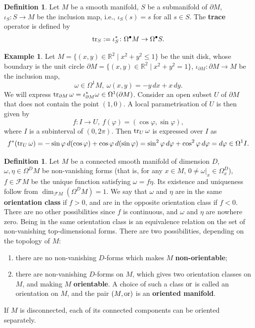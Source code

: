 \documentclass{elsarticle}
\theoremstyle{definition}
\newtheorem{definition}[theorem]{Definition}
\newtheorem{example}[theorem]{Example}
\newcommand{\tr}{\mathop{\rm tr}\nolimits}
\newcommand{\OR}{\mathop{\rm or}\nolimits}
\newcommand{\R}{\mathbb{R}}
\newcommand{\set}[2]{\{#1 \mid #2\}}
\newcommand{\restrict}[2]{\left.#1\right|_{#2}}
\newcommand{\newterm}[1]{\textbf{#1}}
\begin{document}
\begin{definition}
  Let $M$ be a smooth manifold, $S$ be a submanifold of $\partial M$, $\iota_S \colon S \to M$ be the inclusion map, i.e., $\iota_S(s) = s$ for all $s \in S$.
  The \newterm{trace} operator is defined by
  \begin{equation}
    \tr_S := \iota_S^* \colon \Omega^\bullet M \to \Omega^\bullet S.
  \end{equation}
\end{definition}
\begin{example}
  Let $M = \set{(x, y) \in \R^2}{x^2 + y^2 \leq 1}$ be the unit disk,
  whose boundary is the unit circle
  $\partial M = \set{(x, y) \in \R^2}{x^2 + y^2 = 1}$,
  $\iota_{\partial M} \colon \partial M \to M$ be the inclusion map,
  \begin{equation}
    \omega \in \Omega^1 M,\ \omega(x, y) = -y\, d x + x\, d y.
  \end{equation}
  We will express $\tr_{\partial M} \omega = \iota_{\partial M}^* \omega \in \Omega^1(\partial M)$.
  Consider an open subset $U$ of $\partial M$ that does not contain the point $(1, 0)$.
  A local parametrisation of $U$ is then given by
  \begin{equation}
    f \colon I \to U,\ f(\varphi) = (\cos \varphi, \sin \varphi),
  \end{equation}
  where $I$ is a subinterval of $(0, 2 \pi)$.
  Then $\tr_U \omega$ is expressed over $I$ as
  \begin{equation}
    f^*(\tr_U \omega)
    = -\sin \varphi\, d(\cos \varphi) + \cos \varphi\, d(\sin \varphi)
    = \sin^2 \varphi\, d \varphi + \cos^2 \varphi\, d \varphi
    = d \varphi
    \in \Omega^1 I.
  \end{equation}
\end{example}
\begin{definition}
  Let $M$ be a connected smooth manifold of dimension $D$,
  $\omega, \eta \in \Omega^D M$ be non-vanishing forms (that is, for any $x \in M$, $0 \neq \restrict{\omega}{x} \in \Omega^D_x$), $f \in \mathcal{F} M$ be the unique function satisfying $\omega = f \eta$.
  Its existence and uniqueness follow from $\dim_{\mathcal{F} M}(\Omega^D M) = 1$.
  We say that $\omega$ and $\eta$ are in the same \newterm{orientation class} if $f > 0$, and are in the opposite orientation class if $f < 0$.
  There are no other possibilities since $f$ is continuous, and $\omega$ and $\eta$ are nowhere zero.
  Being in the same orientation class is an equivalence relation on the set of non-vanishing top-dimensional forms.
  There are two possibilities, depending on the topology of $M$:
  \begin{enumerate}
    \item
      there are no non-vanishing $D$-forms which makes $M$ \newterm{non-orientable};
    \item
      there are non-vanishing $D$-forms on $M$, which gives two orientation classes on $M$, and making $M$ \newterm{orientable}.
      A choice of such a class $\OR$ is called an orientation on $M$, and the pair $(M, \OR)$ is an \newterm{oriented manifold}.
  \end{enumerate}
If $M$ is disconnected, each of its connected components can be oriented separately.
\end{definition}
\end{document}
